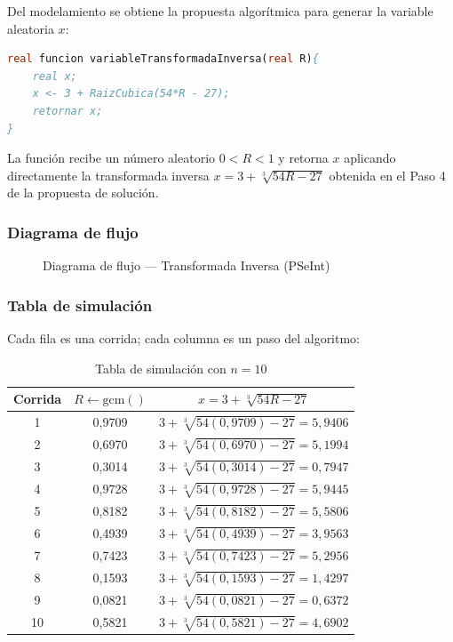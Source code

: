 \documentclass[12pt, a4paper]{article}
\newenvironment{mitabla}[2][H]{%
  \begin{table}[#1]
  \centering
  \caption{#2}
  \small
}{%
  \end{table}
}
\begin{document}
Del modelamiento se obtiene la propuesta algorítmica para generar la variable aleatoria $x$:

\begin{lstlisting}[caption={Algoritmo — Generación de variable aleatoria}, language=Pascal]
real funcion variableTransformadaInversa(real R){
    real x;
    x <- 3 + RaizCubica(54*R - 27);
    retornar x;
}
\end{lstlisting}

La función recibe un número aleatorio $0 < R < 1$ y retorna $x$ aplicando directamente la transformada inversa $x = 3 + \sqrt[3]{54R - 27}$ obtenida en el Paso 4 de la propuesta de solución.

\subsubsection{Diagrama de flujo}

\begin{figure}[H]
\centering
{}
\caption{Diagrama de flujo — Transformada Inversa (PSeInt)}
\end{figure}

\subsubsection{Tabla de simulación}

Cada fila es una corrida; cada columna es un paso del algoritmo:

\begin{mitabla}[H]{Tabla de simulación con $n=10$}
\begin{tabular}{c cc}
\toprule
Corrida & $R \leftarrow \text{gcm}()$ & $x = 3+\sqrt[3]{54R-27}$ \\
\midrule
1  & 0,9709 & $3+\sqrt[3]{54(0{,}9709)-27} = 5{,}9406$ \\
2  & 0,6970 & $3+\sqrt[3]{54(0{,}6970)-27} = 5{,}1994$ \\
3  & 0,3014 & $3+\sqrt[3]{54(0{,}3014)-27} = 0{,}7947$ \\
4  & 0,9728 & $3+\sqrt[3]{54(0{,}9728)-27} = 5{,}9445$ \\
5  & 0,8182 & $3+\sqrt[3]{54(0{,}8182)-27} = 5{,}5806$ \\
6  & 0,4939 & $3+\sqrt[3]{54(0{,}4939)-27} = 3{,}9563$ \\
7  & 0,7423 & $3+\sqrt[3]{54(0{,}7423)-27} = 5{,}2956$ \\
8  & 0,1593 & $3+\sqrt[3]{54(0{,}1593)-27} = 1{,}4297$ \\
9  & 0,0821 & $3+\sqrt[3]{54(0{,}0821)-27} = 0{,}6372$ \\
10 & 0,5821 & $3+\sqrt[3]{54(0{,}5821)-27} = 4{,}6902$ \\
\bottomrule
\end{tabular}
\end{mitabla}
\end{document}
